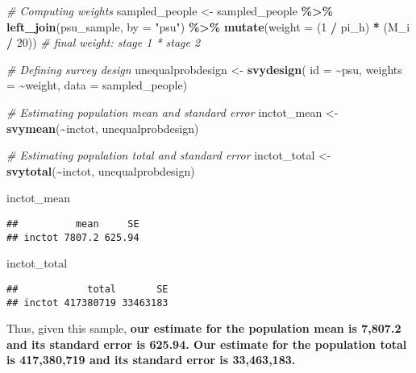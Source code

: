 \documentclass[]{article}
\newenvironment{Shaded}{\begin{snugshade}}{\end{snugshade}}
\newcommand{\AttributeTok}[1]{\textcolor[rgb]{0.13,0.29,0.53}{#1}}
\newcommand{\CommentTok}[1]{\textcolor[rgb]{0.56,0.35,0.01}{\textit{#1}}}
\newcommand{\DecValTok}[1]{\textcolor[rgb]{0.00,0.00,0.81}{#1}}
\newcommand{\FunctionTok}[1]{\textcolor[rgb]{0.13,0.29,0.53}{\textbf{#1}}}
\newcommand{\NormalTok}[1]{#1}
\newcommand{\OtherTok}[1]{\textcolor[rgb]{0.56,0.35,0.01}{#1}}
\newcommand{\SpecialCharTok}[1]{\textcolor[rgb]{0.81,0.36,0.00}{\textbf{#1}}}
\newcommand{\StringTok}[1]{\textcolor[rgb]{0.31,0.60,0.02}{#1}}
\begin{document}
\begin{Shaded}
\begin{Highlighting}[]
\CommentTok{\# Computing weights }
\NormalTok{sampled\_people }\OtherTok{\textless{}{-}}\NormalTok{ sampled\_people }\SpecialCharTok{\%\textgreater{}\%}
  \FunctionTok{left\_join}\NormalTok{(psu\_sample, }\AttributeTok{by =} \StringTok{"psu"}\NormalTok{) }\SpecialCharTok{\%\textgreater{}\%}
  \FunctionTok{mutate}\NormalTok{(}\AttributeTok{weight =}\NormalTok{ (}\DecValTok{1} \SpecialCharTok{/}\NormalTok{ pi\_h) }\SpecialCharTok{*}\NormalTok{ (M\_i }\SpecialCharTok{/} \DecValTok{20}\NormalTok{)) }\CommentTok{\# final weight: stage 1 * stage 2}

\CommentTok{\# Defining survey design }
\NormalTok{unequalprobdesign }\OtherTok{\textless{}{-}} \FunctionTok{svydesign}\NormalTok{(}
  \AttributeTok{id =} \SpecialCharTok{\textasciitilde{}}\NormalTok{psu, }
  \AttributeTok{weights =} \SpecialCharTok{\textasciitilde{}}\NormalTok{weight, }
  \AttributeTok{data =}\NormalTok{ sampled\_people)}

\CommentTok{\# Estimating population mean and standard error }
\NormalTok{inctot\_mean }\OtherTok{\textless{}{-}} \FunctionTok{svymean}\NormalTok{(}\SpecialCharTok{\textasciitilde{}}\NormalTok{inctot, unequalprobdesign)}

\CommentTok{\# Estimating population total and standard error}
\NormalTok{inctot\_total }\OtherTok{\textless{}{-}} \FunctionTok{svytotal}\NormalTok{(}\SpecialCharTok{\textasciitilde{}}\NormalTok{inctot, unequalprobdesign)}

\newpage 
\NormalTok{inctot\_mean}
\end{Highlighting}
\end{Shaded}

\begin{verbatim}
##          mean     SE
## inctot 7807.2 625.94
\end{verbatim}

\begin{Shaded}
\begin{Highlighting}[]
\NormalTok{inctot\_total}
\end{Highlighting}
\end{Shaded}

\begin{verbatim}
##            total       SE
## inctot 417380719 33463183
\end{verbatim}

Thus, given this sample, \textbf{our estimate for the population mean is 7,807.2 and its standard error is 625.94. Our estimate for the population total is 417,380,719 and its standard error is 33,463,183.}
\end{document}
